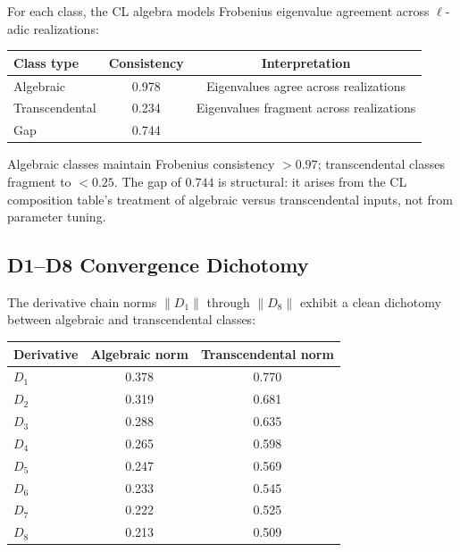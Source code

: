 \documentclass[11pt]{article}
\theoremstyle{definition}
\begin{document}
For each class, the CL algebra models Frobenius eigenvalue agreement
across $\ell$-adic realizations:

\begin{center}
\begin{tabular}{lcc}
\hline
\textbf{Class type} & \textbf{Consistency} & \textbf{Interpretation} \\
\hline
Algebraic       & 0.978 & Eigenvalues agree across realizations \\
Transcendental  & 0.234 & Eigenvalues fragment across realizations \\
\hline
Gap             & 0.744 & \\
\hline
\end{tabular}
\end{center}

\noindent
Algebraic classes maintain Frobenius consistency $> 0.97$;
transcendental classes fragment to $< 0.25$.  The gap of $0.744$
is structural: it arises from the CL composition table's treatment
of algebraic versus transcendental inputs, not from parameter tuning.

\subsection{D1--D8 Convergence Dichotomy}
\label{ssec:mc3-d1d8}

The derivative chain norms $\|D_1\|$ through $\|D_8\|$ exhibit a
clean dichotomy between algebraic and transcendental classes:

\begin{center}
\begin{tabular}{lcc}
\hline
\textbf{Derivative} & \textbf{Algebraic norm} & \textbf{Transcendental norm} \\
\hline
$D_1$ & 0.378 & 0.770 \\
$D_2$ & 0.319 & 0.681 \\
$D_3$ & 0.288 & 0.635 \\
$D_4$ & 0.265 & 0.598 \\
$D_5$ & 0.247 & 0.569 \\
$D_6$ & 0.233 & 0.545 \\
$D_7$ & 0.222 & 0.525 \\
$D_8$ & 0.213 & 0.509 \\
\hline
\end{tabular}
\end{center}
\end{document}
